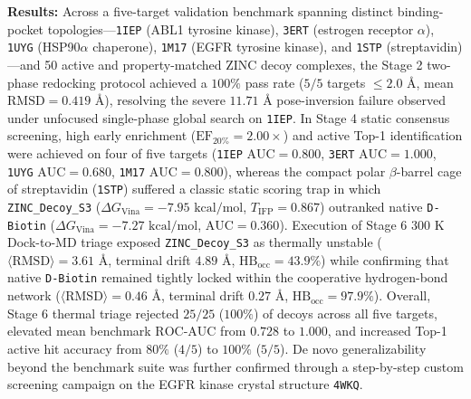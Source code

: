 \documentclass[11pt,a4paper]{article}
\begin{document}
\noindent\textbf{Results:} Across a five-target validation benchmark spanning distinct binding-pocket topologies---\texttt{1IEP} (ABL1 tyrosine kinase), \texttt{3ERT} (estrogen receptor $\alpha$), \texttt{1UYG} (HSP90$\alpha$ chaperone), \texttt{1M17} (EGFR tyrosine kinase), and \texttt{1STP} (streptavidin)---and 50 active and property-matched ZINC decoy complexes, the Stage 2 two-phase redocking protocol achieved a $100\%$ pass rate ($5/5$ targets $\le 2.0\text{ \AA}$, mean $\text{RMSD} = 0.419\text{ \AA}$), resolving the severe $11.71\text{ \AA}$ pose-inversion failure observed under unfocused single-phase global search on \texttt{1IEP}. In Stage 4 static consensus screening, high early enrichment ($\text{EF}_{20\%} = 2.00\times$) and active Top-1 identification were achieved on four of five targets (\texttt{1IEP} $\text{AUC}=0.800$, \texttt{3ERT} $\text{AUC}=1.000$, \texttt{1UYG} $\text{AUC}=0.680$, \texttt{1M17} $\text{AUC}=0.800$), whereas the compact polar $\beta$-barrel cage of streptavidin (\texttt{1STP}) suffered a classic static scoring trap in which \texttt{ZINC\_Decoy\_S3} ($\Delta G_{\text{Vina}} = -7.95\text{ kcal/mol}$, $T_{\text{IFP}} = 0.867$) outranked native \texttt{D-Biotin} ($\Delta G_{\text{Vina}} = -7.27\text{ kcal/mol}$, $\text{AUC} = 0.360$). Execution of Stage 6 $300\text{ K}$ Dock-to-MD triage exposed \texttt{ZINC\_Decoy\_S3} as thermally unstable ($\langle\text{RMSD}\rangle = 3.61\text{ \AA}$, terminal drift $4.89\text{ \AA}$, $\text{HB}_{\text{occ}} = 43.9\%$) while confirming that native \texttt{D-Biotin} remained tightly locked within the cooperative hydrogen-bond network ($\langle\text{RMSD}\rangle = 0.46\text{ \AA}$, terminal drift $0.27\text{ \AA}$, $\text{HB}_{\text{occ}} = 97.9\%$). Overall, Stage 6 thermal triage rejected $25/25$ ($100\%$) of decoys across all five targets, elevated mean benchmark $\text{ROC-AUC}$ from $0.728$ to $1.000$, and increased Top-1 active hit accuracy from $80\%$ ($4/5$) to $100\%$ ($5/5$). De novo generalizability beyond the benchmark suite was further confirmed through a step-by-step custom screening campaign on the EGFR kinase crystal structure \texttt{4WKQ}.

\vspace{6pt}

\vspace{6pt}
\end{document}
